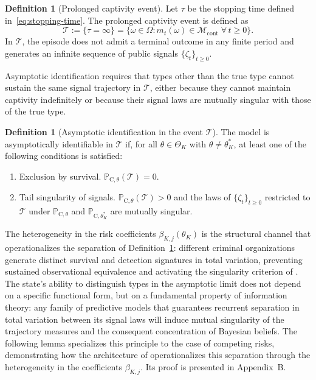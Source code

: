 \documentclass[review,authoryear,12pt]{elsarticle}
\theoremstyle{plain}
\theoremstyle{definition}
\newtheorem{definition}[theorem]{Definition}
\newcommand{\ProbC}[1]{\mathbb{P}_{\mathrm{C},#1}}
\newcommand{\ThetaK}{\Theta_K}
\newcommand{\1}{\mathbf{1}}
\begin{document}
\begin{definition}[Prolonged captivity event]\label{def:event-T-long}
Let $\tau$ be the stopping time defined in~\eqref{eq:stopping-time}. The prolonged captivity event is defined as
\[
\mathcal{T}:=\{\tau=\infty\}=\bigl\{\omega\in\Omega:m_t(\omega)\in\mathcal{M}_{\mathrm{cont}}\;\forall\,t\ge 0\bigr\}.
\]
In $\mathcal{T}$, the episode does not admit a terminal outcome in any finite period and generates an infinite sequence of public signals $\{\zeta_t\}_{t\ge 0}$.
\end{definition}

Asymptotic identification requires that types other than the true type cannot sustain the same signal trajectory in $\mathcal{T}$, either because they cannot maintain captivity indefinitely or because their signal laws are mutually singular with those of the true type.

\begin{definition}[Asymptotic identification in the event $\mathcal{T}$]\label{def:asymptotic-id}
The model is asymptotically identifiable in $\mathcal{T}$ if, for all $\theta\in\ThetaK$ with $\theta\neq\theta_K^\ast$, at least one of the following conditions is satisfied:
\begin{enumerate}
  \item[\textup{(a)}] Exclusion by survival. $\ProbC{\theta}(\mathcal{T})=0$.
  \item[\textup{(b)}] Tail singularity of signals. $\ProbC{\theta}(\mathcal{T})>0$ and the laws of $\{\zeta_t\}_{t\ge 0}$ restricted to $\mathcal{T}$ under $\ProbC{\theta}$ and $\ProbC{\theta_K^\ast}$ are mutually singular.
\end{enumerate}
\end{definition}

The heterogeneity in the risk coefficients $\beta_{K,j}(\theta_K)$ is the structural channel that operationalizes the separation of Definition~\ref{def:asymptotic-id}: different criminal organizations generate distinct survival and detection signatures in total variation, preventing sustained observational equivalence and activating the singularity criterion of \citet{Kakutani1948}. The state's ability to distinguish types in the asymptotic limit does not depend on a specific functional form, but on a fundamental property of information theory: any family of predictive models that guarantees recurrent separation in total variation between its signal laws will induce mutual singularity of the trajectory measures and the consequent concentration of Bayesian beliefs. The following lemma specializes this principle to the case of competing risks, demonstrating how the architecture of \citet{Cox1972} operationalizes this separation through the heterogeneity in the coefficients $\beta_{K,j}$. Its proof is presented in Appendix~B.
\end{document}
